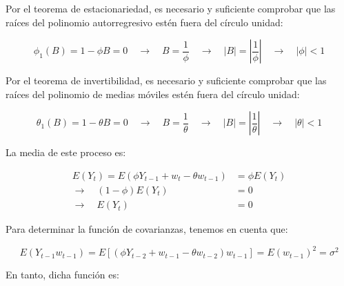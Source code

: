 \documentclass[a4paper,10pt]{article}
\begin{document}
Por el teorema de estacionariedad, es necesario y suficiente comprobar que las raíces del polinomio autorregresivo estén fuera del círculo unidad:

\begin{equation*}
\phi_1(B) = 1 - \phi B = 0 \quad \to \quad B = \frac{1}{\phi} \quad \to \quad |B| = |\frac{1}{\phi}| \quad \to \quad |\phi| < 1
\end{equation*}

Por el teorema de invertibilidad, es necesario y suficiente comprobar que las raíces del polinomio de medias móviles estén fuera del círculo unidad:

\begin{equation*}
\theta_1(B) = 1 - \theta B = 0 \quad \to \quad B = \frac{1}{\theta} \quad \to \quad |B| = |\frac{1}{\theta}| \quad \to \quad |\theta| < 1
\end{equation*}

La media de este proceso es:

\begin{equation*}
\begin{split}
E(Y_t) = E(\phi Y_{t-1} + w_t - \theta w_{t-1}) &= \phi E(Y_t) \\
\to \quad (1-\phi)E(Y_t) &= 0 \\
\to \quad E(Y_t) &= 0
\end{split}
\end{equation*}

Para determinar la función de covarianzas, tenemos en cuenta que:

\begin{equation*}
E(Y_{t-1}w_{t-1}) = E[(\phi Y_{t-2} + w_{t-1} - \theta w_{t-2})w_{t-1}] = E(w_{t-1})^2 = \sigma^2
\end{equation*}


En tanto, dicha función es:
\end{document}
